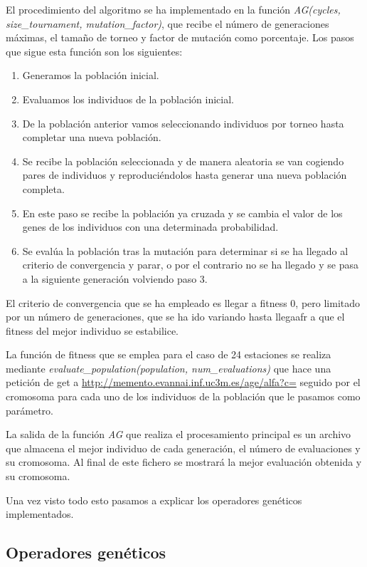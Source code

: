 \documentclass[12pt, spanish, pdftex]{UC3M_document}
\begin{document}
El procedimiento del algoritmo se ha implementado en la función \textit{AG(cycles, size\_tournament, mutation\_factor)}, que recibe el número de generaciones máximas, el tamaño de torneo y factor de mutación como porcentaje. Los pasos que sigue esta función son los siguientes:
\begin{enumerate}
	\item Generamos la población inicial.
	\item Evaluamos los individuos de la población inicial.
	\item De la población anterior vamos seleccionando individuos por torneo hasta completar una nueva población.
	\item Se recibe la población seleccionada y de manera aleatoria se van cogiendo pares de individuos y reproduciéndolos hasta generar una nueva población completa.
	\item En este paso se recibe la población ya cruzada y se cambia el valor de los genes de los individuos con una determinada probabilidad.
	\item Se evalúa la población tras la mutación para determinar si se ha llegado al criterio de convergencia y parar, o por el contrario no se ha llegado y se pasa a la siguiente generación volviendo paso 3.
\end{enumerate}

El criterio de convergencia que se ha empleado es llegar a fitness 0, pero limitado por un número de generaciones, que se ha ido variando hasta llegaafr a que el fitness del mejor individuo se estabilice.

La función de fitness que se emplea para el caso de 24 estaciones se realiza mediante \textit{evaluate\_population(population, num\_evaluations)} que hace una petición de get a \href{http://memento.evannai.inf.uc3m.es/age/alfa?c=}{http://memento.evannai.inf.uc3m.es/age/alfa?c=} seguido por el cromosoma para cada uno de los individuos de la población que le pasamos como parámetro.

La salida de la función \textit{AG} que realiza el procesamiento principal es un archivo que almacena el mejor individuo de cada generación, el número de evaluaciones y su cromosoma. Al final de este fichero se mostrará la mejor evaluación obtenida y su cromosoma.

Una vez visto todo esto pasamos a explicar los operadores genéticos implementados.
\pagebreak

\subsection{Operadores genéticos}
\end{document}
